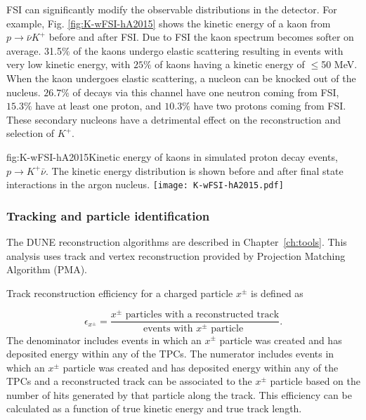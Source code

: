 FSI can significantly modify the observable distributions in the detector.  For example, Fig. \ref{fig:K-wFSI-hA2015} shows the kinetic energy of a kaon from $p\rightarrow \bar{\nu}K^{+}$ before and after FSI. Due to FSI the kaon spectrum becomes softer on average. 31.5$\%$ of the kaons undergo elastic scattering resulting in events with very low kinetic energy, with $25\%$ of kaons having a kinetic energy of $\le$50 MeV. When the kaon undergoes elastic scattering, a nucleon can be knocked out of the nucleus. $26.7\%$ of decays via this channel have one neutron coming from FSI, $15.3\%$ have at least one proton, and $10.3\%$ have two protons coming from FSI. These secondary nucleons have a detrimental effect on the reconstruction and selection of $K^{+}$.

\begin{dunefigure}{fig:K-wFSI-hA2015}{Kinetic energy of kaons in simulated proton decay events, $p\rightarrow K^{+} \bar{\nu}$.  The kinetic energy distribution is shown before and after final state interactions in the argon nucleus.}
\texttt{[image: K-wFSI-hA2015.pdf]}
\end{dunefigure}

\subsubsection{Tracking and particle identification}
\label{sec:event-reconstruction}

The DUNE reconstruction algorithms are described in Chapter~\ref{ch:tools}.  This analysis uses \threed track and vertex reconstruction provided by Projection Matching Algorithm (PMA).

Track reconstruction efficiency for a charged particle $x^{\pm}$ is defined as 

\begin{equation}
\epsilon_{x^{\pm}} = \frac{\mbox{$x^{\pm}$ particles with a reconstructed track}}{\mbox{events with $x^{\pm}$ particle }}.
\end{equation}
The denominator includes events in which an $x^{\pm}$ particle was created and has deposited energy within any of the TPCs.  The numerator includes events in which an $x^{\pm}$ particle was created and has deposited energy within any of the TPCs and a reconstructed track can be associated to the $x^{\pm}$ particle based on the number of hits generated by that particle along the track. This efficiency can be calculated as a function of true kinetic energy and true track length.

